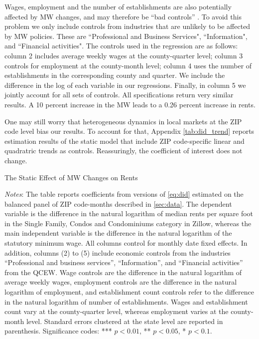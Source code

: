 Wages, employment and the number of establishments are also potentially affected by MW changes,
and may therefore be ``bad controls'' 
\parencite{AngristPischke2009}. To avoid this problem we only include controls from industries 
that are unlikely to be affected by MW policies. These are ``Professional and Business Services", 
``Information", and ``Financial activities". The controls used in the regression are as follows:
column 2 includes average weekly wages at the county-quarter level; column 3 controls for 
employment at the county-month level; column 4 uses the number of establishments in the 
corresponding county and quarter. We include the difference in the log of each variable in our
regressions. Finally, in column 5 we jointly account for all sets of controls. All specifications 
return very similar results. A 10 percent increase in the MW leads to a 0.26 percent increase 
in rents. 

One may still worry that heterogeneous dynamics in local markets at the ZIP code level bias our 
results. To account for that, Appendix \autoref{tab:did_trend} reports estimation results of the 
static model that include ZIP code-specific linear and quadratric trends as controls. 
Reassuringly, the coefficient of interest does not change.

\begin{table}[h!]
    \caption{The Static Effect of MW Changes on Rents}
    \label{tab:static_model}
    \centering
    
    \begin{minipage}{0.9\textwidth} \footnotesize
		\vspace{3mm} 
		\textit{Notes}: The table reports coefficients from versions of \autoref{eq:did} 
		estimated on the balanced panel of ZIP code-months described in \autoref{sec:data}. 
		The dependent variable is the difference in the natural logarithm of median	rents 
		per square foot in the Single Family, Condos and Condominiums category in Zillow, 
		whereas the main independent variable is the difference in the natural logarithm of 
		the statutory minimum wage. All columns control for monthly date fixed effects. In 
		addition, columns (2) to (5) include economic controls from the industries 
		``Professional and business services'', ``Information'', and ``Financial activities'' 
		from the QCEW. Wage controls are the difference in the natural logarithm of average 
		weekly wages, employment controls are the difference in the natural logarithm of 
		employment, and establishment count controls refer to the difference in the natural 
		logarithm of number of establishments. Wages and establishment count vary at the 
		county-quarter level, whereas employment varies at the county-month level. 
		Standard errors clustered at the state level are reported in parenthesis. Significance 
		codes: *** $p < 0.01$, ** $p < 0.05$, * $p < 0.1$.
	\end{minipage}
\end{table}

